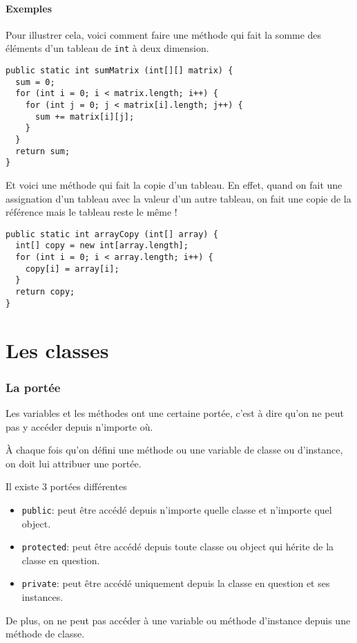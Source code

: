 \subsection{Exemples}
Pour illustrer cela, voici comment faire une méthode qui fait la somme des
éléments d'un tableau de \verb|int| à deux dimension.
\begin{lstlisting}
public static int sumMatrix (int[][] matrix) {
  sum = 0;
  for (int i = 0; i < matrix.length; i++) {
    for (int j = 0; j < matrix[i].length; j++) {
      sum += matrix[i][j];
    }
  }
  return sum;
}
\end{lstlisting}

Et voici une méthode qui fait la copie d'un tableau.
En effet, quand on fait une assignation d'un tableau avec la valeur d'un autre
tableau, on fait une copie de la référence mais le tableau reste le même !
\begin{lstlisting}
public static int arrayCopy (int[] array) {
  int[] copy = new int[array.length];
  for (int i = 0; i < array.length; i++) {
    copy[i] = array[i];
  }
  return copy;
}
\end{lstlisting}

\part{Les classes}
\section{La portée}
Les variables et les méthodes ont une certaine portée, c'est à dire
qu'on ne peut pas y accéder depuis n'importe où.

À chaque fois qu'on défini une méthode ou une variable de classe ou
d'instance, on doit lui attribuer une portée.

Il existe 3 portées différentes
\begin{itemize}
  \item \verb|public|: peut être accédé depuis n'importe quelle
    classe et n'importe quel object.
  \item \verb|protected|: peut être accédé depuis toute classe ou object
    qui hérite de la classe en question.
  \item \verb|private|: peut être accédé uniquement depuis la classe
    en question et ses instances.
\end{itemize}

De plus, on ne peut pas accéder à une variable ou méthode d'instance
depuis une méthode de classe.

